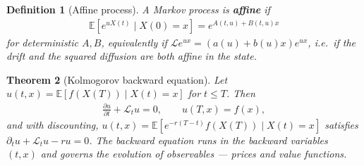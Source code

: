 \documentclass{report}
\theoremstyle{spacedplain}
\newtheorem{theorem}{Theorem}[section]
\theoremstyle{spaceddefinition}
\newtheorem{definition}[theorem]{Definition}
\theoremstyle{spacedremark}
\begin{document}
\begin{definition}[Affine process]
A Markov process is \textbf{affine} if
\begin{align}
    \mathbb{E}\!\left[e^{uX(t)}\mid X(0)=x\right] = e^{A(t,u)+B(t,u)x}
\end{align}
for deterministic $A,B$, equivalently if $\mathcal{L}e^{ux} = (a(u)+b(u)x)e^{ux}$, i.e.\ if the drift and the \emph{squared} diffusion are both affine in the state.
\end{definition}

\begin{theorem}[Kolmogorov backward equation]
Let $u(t,x) = \mathbb{E}[f(X(T))\mid X(t)=x]$ for $t\leq T$. Then
\begin{align}
    \frac{\partial u}{\partial t} + \mathcal{L}_tu = 0, \qquad u(T,x) = f(x),
\end{align}
and with discounting, $u(t,x)=\mathbb{E}[e^{-r(T-t)}f(X(T))\mid X(t)=x]$ satisfies $\partial_t u + \mathcal{L}_tu - ru = 0$. The backward equation runs in the \emph{backward} variables $(t,x)$ and governs the evolution of \emph{observables} --- prices and value functions.
\end{theorem}
\end{document}
